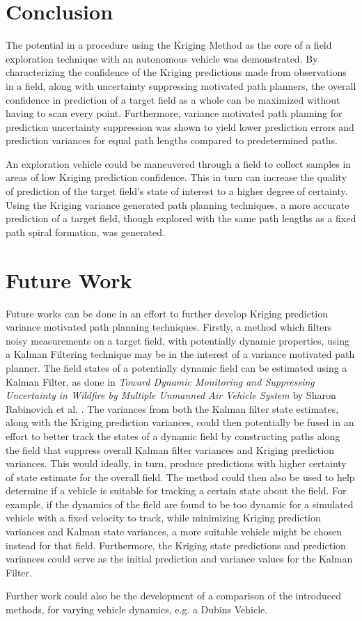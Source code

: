 \chapter*{Conclusion}
The potential in a procedure using the Kriging Method as the core of a field exploration technique with an autonomous vehicle was demonstrated. By characterizing the confidence of the Kriging predictions made from observations in a field, along with uncertainty suppressing motivated path planners, the overall confidence in prediction of a target field as a whole can be maximized without having to scan every point. Furthermore, variance motivated path planning for prediction uncertainty suppression was shown to yield lower prediction errors and prediction variances for equal path lengths compared to predetermined paths.

An exploration vehicle could be maneuvered through a field to collect samples in areas of low Kriging prediction confidence. This in turn can increase the quality of prediction of the target field's state of interest to a higher degree of certainty. Using the Kriging variance generated path planning techniques, a more accurate prediction of a target field, though explored with the same path lengths as a fixed path spiral formation, was generated. 

\chapter*{Future Work}
Future works can be done in an effort to further develop Kriging prediction variance motivated path planning techniques. Firstly, a method which filters noisy measurements on a target field, with potentially dynamic properties, using a Kalman Filtering technique may be in the interest of a variance motivated path planner. The field states of a potentially dynamic field can be estimated using a Kalman Filter, as done in \textit{Toward Dynamic Monitoring and Suppressing Uncertainty in Wildfire by Multiple Unmanned Air Vehicle System} by Sharon Rabinovich et al. \cite{sharon:jor}. The variances from both the Kalman filter state estimates, along with the Kriging prediction variances, could then potentially be fused in an effort to better track the states of a dynamic field by constructing paths along the field that suppress overall Kalman filter variances and Kriging prediction variances. This would ideally, in turn, produce predictions with higher certainty of state estimate for the overall field. The method could then also be used to help determine if a vehicle is suitable for tracking a certain state about the field. For example, if the dynamics of the field are found to be too dynamic for a simulated vehicle with a fixed velocity to track, while minimizing Kriging prediction variances and Kalman state variances, a more suitable vehicle might be chosen instead for that field. Furthermore, the Kriging state predictions and prediction variances could serve as the initial prediction and variance values for the Kalman Filter.

Further work could also be the development of a comparison of the introduced methods, for varying vehicle dynamics, e.g. a Dubins Vehicle.